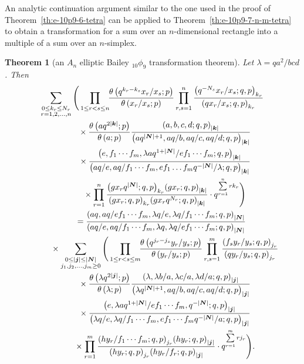 \documentclass[pdftex]{sigma}
\numberwithin{equation}{section}
\newtheorem{Theorem}{Theorem}[section]
\newcommand{\sumN}{{\left| \boldsymbol{N} \right|}}
\newcommand\sumj{{\left| \boldsymbol {j} \right|}}
\newcommand\sumk{{\left| \boldsymbol{k} \right|}}
\newcommand{\triprod}[1]{\prod\limits_{1\le r < s \le #1}}
\newcommand{\sqprod}[1]{\prod\limits_{r, s =1}^{#1}} %
\newcommand{\smallprod}[1]{\prod\limits_{r =1}^{#1}} %
\newcommand{\xover}[1]{#1_{r}/#1_{s}}
\newcommand{\ellipticqrfac}[2]{{\left({#1}; q, p\right)_{#2}}} %
\newcommand{\elliptictheta}[1]{\theta \left({#1} ; p\right) }
\newcommand{\ellipticvandermonde}[3]{\triprod{#3} %
\!\! \frac{\elliptictheta{q^{#2_r-#2_s} \xover {#1} }}{\elliptictheta{\xover{#1}}}
}
\begin{document}
An analytic continuation argument similar to the one used in the proof of Theorem~\ref{th:e-10p9-6-tetra} can be applied to Theorem~\ref{th:e-10p9-7-n-m-tetra} to obtain a transformation for a sum over an $n$-dimensional rectangle into a multiple of a sum over an $n$-simplex.
\begin{Theorem}[an $A_n$ elliptic Bailey $_{10}\phi_9$ transformation theorem] \label{th:e-10p9-7-n-m-rect-tetra}
Let $\lambda = qa^2/bcd$. Then
\begin{gather*}
\sum\limits_{\substack{0\leq k_r\leq N_r \\ r=1,2,\dots,n} }
\Bigg( \ellipticvandermonde{x}{k}{n} \sqprod n \frac{\ellipticqrfac{q^{-N_s}\xover{x}}{k_r} }{\ellipticqrfac{q\xover{x}}{k_r} } \notag \\
 \qquad\quad{} \times \frac{\elliptictheta{a q^{2\sumk}}}{\elliptictheta{a }}
\frac{\ellipticqrfac{a, b, c, d}{\sumk}} {\ellipticqrfac{aq^{\sumN+1}, aq/b, aq/c, aq/d}{\sumk}} \\
 \qquad\quad{} \times
\frac{\ellipticqrfac{e,f_1\cdots f_m, \lambda aq^{1+\sumN}/e f_1\cdots f_m}{\sumk}}
{\ellipticqrfac{a q/e, aq/f_1\cdots f_m,
e f_1\dots f_m q^{-\sumN}/\lambda}{\sumk}} \\
\qquad\quad{}\times \smallprod n \frac{\ellipticqrfac{g x_rq^\sumN}{k_r}
\ellipticqrfac{g x_r}{\sumk}} {\ellipticqrfac{g x_r}{k_r} \ellipticqrfac{g x_rq^{N_r}}{\sumk} }
\cdot q^{\sum\limits_{r=1}^n rk_r} \Bigg)\notag \\
\qquad{} =
\frac{\ellipticqrfac{aq, aq/e f_1\cdots f_m, \lambda q/e, \lambda q/f_1\cdots f_m}{\sumN}}{\ellipticqrfac{ a q/e, aq/f_1\cdots f_m, \lambda q,
\lambda q/e f_1\cdots f_m}{\sumN}}\notag \\
\qquad\quad{}\times
\sum\limits_{\substack{0\leq \sumj\leq \sumN \\
j_1,j_2, \dots, j_m\geq 0} }
\Bigg( \ellipticvandermonde{y}{j}{m}
\sqprod m \frac{\ellipticqrfac{f_s\xover{y}}{j_r} }{\ellipticqrfac{q\xover{y}}{j_r} } \notag \\
\qquad\quad{} \times
\frac{\elliptictheta{\lambda q^{2\sumj}}}{\elliptictheta{\lambda }}
\frac{\ellipticqrfac{\lambda , \lambda b/a, \lambda c/a , \lambda d/a}{\sumj}}
{\ellipticqrfac{ \lambda q^{\sumN+1}, a q/b, aq/c, aq/d}{\sumj}}\\
 \qquad\quad{} \times
\frac{\ellipticqrfac{e,
\lambda aq^{1+\sumN}/e f_1\cdots f_m, q^{-\sumN}}{\sumj}}
{\ellipticqrfac{ \lambda q/e, \lambda q/f_1\cdots f_m,
e f_1\cdots f_m q^{-\sumN}/a}{\sumj}}
\\
\qquad\quad{} \times
\smallprod m \frac{\ellipticqrfac{h y_r/f_1\cdots f_m}{j_r}
\ellipticqrfac{h y_r}{\sumj}}{\ellipticqrfac{h y_r}{j_r}\ellipticqrfac{h y_r/f_r}{\sumj} } \cdot q^{\sum\limits_{r=1}^m rj_r} \Bigg). %
\end{gather*}
\end{Theorem}
\end{document}
